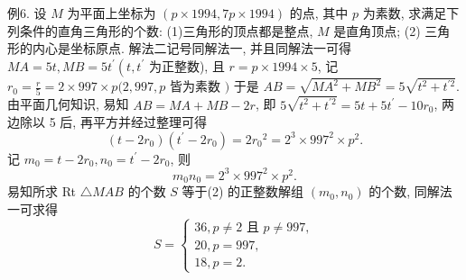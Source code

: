 例6. 设 $M$ 为平面上坐标为 $(p \times 1994,7 p \times 1994)$ 的点, 其中 $p$ 为素数, 求满足下列条件的直角三角形的个数:
(1)三角形的顶点都是整点, $M$ 是直角顶点;
(2) 三角形的内心是坐标原点.
解法二记号同解法一, 并且同解法一可得 $M A=5 t, M B=5 t^{\prime}\left(t, t^{\prime}\right.$ 为正整数), 且 $r=p \times 1994 \times 5$, 记 $r_0=\frac{r}{5}=2 \times 997 \times p(2,997, p$ 皆为素数 $)$ 于是 $A B=\sqrt{M A^2+M B^2}=5 \sqrt{t^2+t^{\prime 2}}$. 由平面几何知识, 易知 $A B=M A+ M B-2 r$, 即 $5 \sqrt{t^2+t^{\prime 2}}=5 t+5 t^{\prime}-10 r_0$, 两边除以 5 后, 再平方并经过整理可得
$$
\left(t-2 r_0\right)\left(t^{\prime}-2 r_0\right)=2 r_0{ }^2=2^3 \times 997^2 \times p^2 .
$$
记 $m_0=t-2 r_0, n_0=t^{\prime}-2 r_0$, 则
$$
m_0 n_0=2^3 \times 997^2 \times p^2 .
$$
易知所求 Rt $\triangle M A B$ 的个数 $S$ 等于(2) 的正整数解组 $\left(m_0, n_0\right)$ 的个数, 同解法一可求得
$$
S=\left\{\begin{array}{l}
36, p \neq 2 \text { 且 } p \neq 997, \\
20, p=997, \\
18, p=2 .
\end{array}\right.
$$


